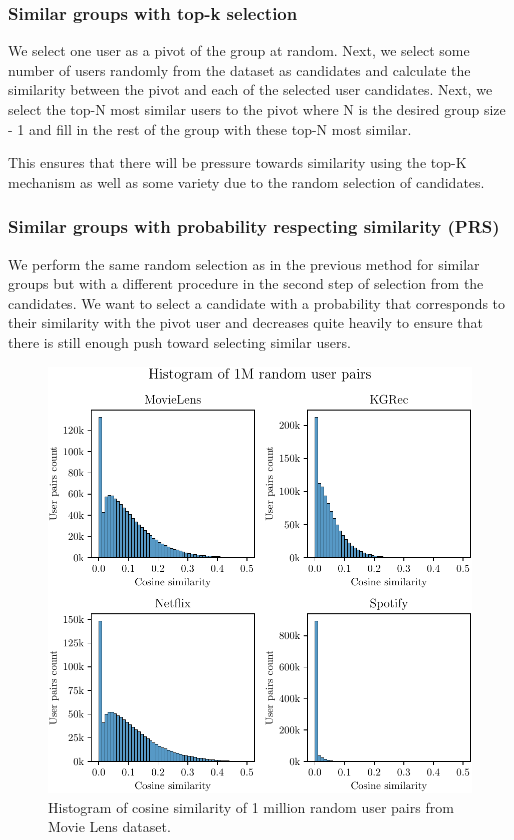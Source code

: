\subsubsection{Similar groups with top-k selection}
We select one user as a pivot of the group at random. Next, we select some number of users randomly from the dataset as candidates and calculate the similarity between the pivot and each of the selected user candidates. Next, we select the top-N most similar users to the pivot where N is the desired group size - 1 and fill in the rest of the group with these top-N most similar.

This ensures that there will be pressure towards similarity using the top-K mechanism as well as some variety due to the random selection of candidates.

\subsubsection{Similar groups with probability respecting similarity (PRS)}
We perform the same random selection as in the previous method for similar groups but with a different procedure in the second step of selection from the candidates. We want to select a candidate with a probability that corresponds to their similarity with the pivot user and decreases quite heavily to ensure that there is still enough push toward selecting similar users.

\begin{figure}[ht!]
    \centering
    \includegraphics{img/figures/histogram_cosine_all.pdf}
    \caption{Histogram of cosine similarity of 1 million random user pairs from Movie Lens dataset.}
    \label{fig:cosine_all_histogram}
\end{figure}

